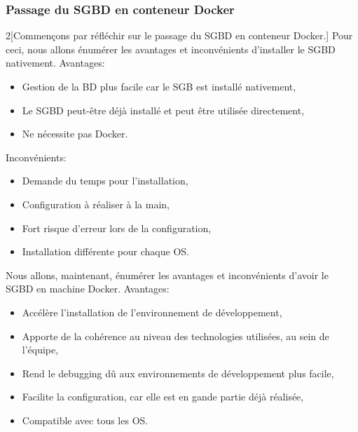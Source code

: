 \documentclass[
    iai, %
    il, %
]{heig-tb}
\begin{document}
\subsubsection{Passage du SGBD en conteneur Docker}
\begin{multicols}{2}[Commençons par réfléchir sur le passage du SGBD en conteneur Docker.]
    Pour ceci, nous allons énumérer les avantages et inconvénients d'installer le SGBD nativement.
    Avantages:
    \begin{itemize}
        \item Gestion de la BD plus facile car le SGB est installé nativement,
        \item Le SGBD peut-être déjà installé et peut être utilisée directement,
        \item Ne nécessite pas Docker.
    \end{itemize}

    Inconvénients:
    \begin{itemize}
        \item Demande du temps pour l'installation,
        \item Configuration à réaliser à la main,
        \item Fort risque d'erreur lors de la configuration,
        \item Installation différente pour chaque OS.
    \end{itemize}

    \columnbreak
    Nous allons, maintenant, énumérer les avantages et inconvénients d'avoir le SGBD en machine Docker.\newline
    Avantages:
    \begin{itemize}
        \item Accélère l'installation de l'environnement de développement, \cite{labrecque,data-flair-pros-cons}
        \item Apporte de la cohérence au niveau des technologies utilisées, au sein de l'équipe, \cite{labrecque, data-flair-use-cases}
        \item Rend le debugging dû aux environnements de développement plus facile, \cite{labrecque,koukia}
        \item Facilite la configuration, car elle est en gande partie déjà réalisée, \cite{data-flair-pros-cons}
        \item Compatible avec tous les OS.
    \end{itemize}


\end{multicols}
\end{document}
